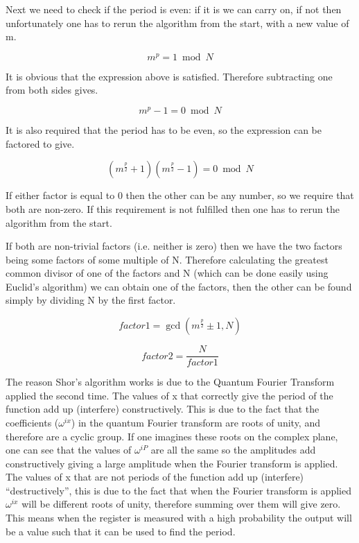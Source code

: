 Next we need to check if the period is even: if it is we can carry on, if not then unfortunately one has to rerun the algorithm from the start, with a new value of m.

\begin{equation}
 m^p = 1 \bmod N
\end{equation}

It is obvious that the expression above is satisfied. Therefore subtracting one from both sides gives.

\begin{equation}
 m^p-1 = 0 \bmod N 
\end{equation}

It is also required that the period has to be even, so the expression can be factored to give.

\begin{equation}
 (m^{\frac{p}{2}}+1)(m^{\frac{p}{2}}-1)=0 \bmod N
\end{equation}

If either factor is equal to 0 then the other can be any number, so we require that both are non-zero. If this requirement is not fulfilled then one has to rerun the algorithm from the start.

If both are non-trivial factors (i.e. neither is zero) then we have the two factors being some factors of some multiple of N. Therefore calculating the greatest common divisor of one of the  factors and N (which can be done easily using Euclid's algorithm) we can obtain one of the factors, then the other can be found simply by dividing N by the first factor.

\begin{equation}
 factor1 = \gcd(m^{\frac{p}{2}}\pm1,N) 
\end{equation}

\begin{equation}
factor2 = \frac{N}{factor1} 
\end{equation}


The reason Shor's algorithm works is due to the Quantum Fourier Transform applied the second time. The values of x that correctly give the period of the function add up (interfere) constructively. This is due to the fact that the coefficients (\(\omega^{i x}\)) in the quantum Fourier transform are roots of unity, and therefore are a cyclic group. If one imagines these roots on the complex plane, one can see that the values of \(\omega^{iP} \) are all the same so the amplitudes add constructively giving a large amplitude when the Fourier transform is applied.  The values of x that are not periods of the function add up (interfere) “destructively”, this is due to the fact that when the Fourier transform is applied \(\omega^{ix} \) will be different roots of unity, therefore summing over them will give zero. This means when the register is measured with a high probability the output will be a value such that it can be used to find the period.
